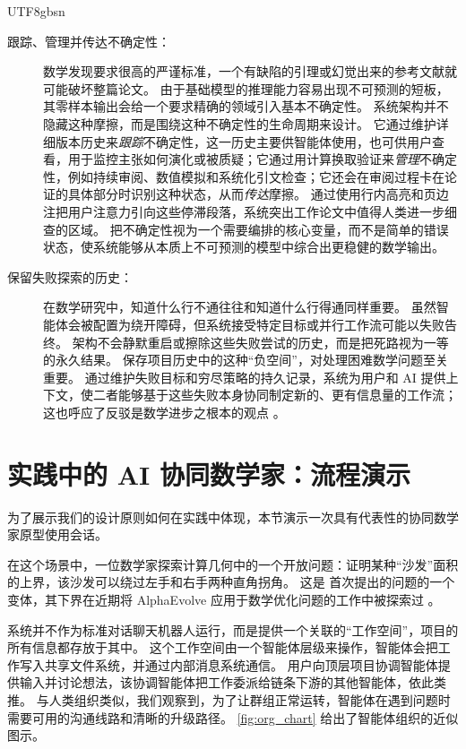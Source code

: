 \documentclass[11pt, a4paper, copyright, gdm]{google}
\begin{document}
\begin{CJK*}{UTF8}{gbsn}
\begin{description}
\item[跟踪、管理并传达不确定性：] 数学发现要求很高的严谨标准，一个有缺陷的引理或幻觉出来的参考文献就可能破坏整篇论文。
由于基础模型的推理能力容易出现不可预测的短板，其零样本输出会给一个要求精确的领域引入基本不确定性。
系统架构并不隐藏这种摩擦，而是围绕这种不确定性的生命周期来设计。
它通过维护详细版本历史来\emph{跟踪}不确定性，这一历史主要供智能体使用，也可供用户查看，用于监控主张如何演化或被质疑；它通过用计算换取验证来\emph{管理}不确定性，例如持续审阅、数值模拟和系统化引文检查；它还会在审阅过程卡在论证的具体部分时识别这种状态，从而\emph{传达}摩擦。
通过使用行内高亮和页边注把用户注意力引向这些停滞段落，系统突出工作论文中值得人类进一步细查的区域。
把不确定性视为一个需要编排的核心变量，而不是简单的错误状态，使系统能够从本质上不可预测的模型中综合出更稳健的数学输出。


\item[保留失败探索的历史：] 在数学研究中，知道什么行不通往往和知道什么行得通同样重要。
虽然智能体会被配置为绕开障碍，但系统接受特定目标或并行工作流可能以失败告终。
架构不会静默重启或擦除这些失败尝试的历史，而是把死路视为一等的永久结果。
保存项目历史中的这种“负空间”，对处理困难数学问题至关重要。
通过维护失败目标和穷尽策略的持久记录，系统为用户和 AI 提供上下文，使二者能够基于这些失败本身协同制定新的、更有信息量的工作流；这也呼应了反驳是数学进步之根本的观点 \citep{lakatos1976}。

\end{description}

%

\section{实践中的 AI 协同数学家：流程演示}

为了展示我们的设计原则如何在实践中体现，本节演示一次具有代表性的协同数学家原型使用会话。

在这个场景中，一位数学家探索计算几何中的一个开放问题：证明某种“沙发”面积的上界，该沙发可以绕过左手和右手两种直角拐角。
这是 \citet{moser1966moving} 首次提出的问题的一个变体，其下界在近期将 AlphaEvolve 应用于数学优化问题的工作中被探索过 \citep{georgiev2025}。

系统并不作为标准对话聊天机器人运行，而是提供一个关联的“工作空间”，项目的所有信息都存放于其中。
这个工作空间由一个智能体层级来操作，智能体会把工作写入共享文件系统，并通过内部消息系统通信。
用户向顶层项目协调智能体提供输入并讨论想法，该协调智能体把工作委派给链条下游的其他智能体，依此类推。
与人类组织类似，我们观察到，为了让群组正常运转，智能体在遇到问题时需要可用的沟通线路和清晰的升级路径。
\cref{fig:org_chart} 给出了智能体组织的近似图示。


\end{CJK*}
\end{document}
